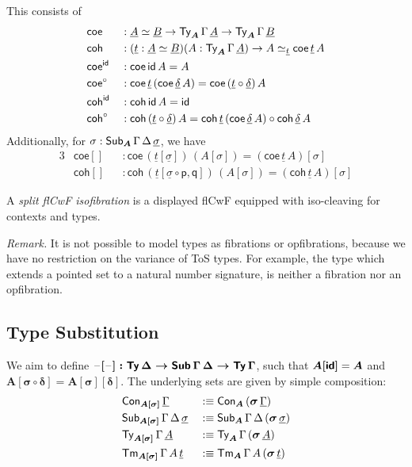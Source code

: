 \documentclass[sigplan,review,anonymous]{acmart}\settopmatter{printfolios=true,printccs=false,printacmref=false}
\newcommand{\p}{\mathsf{p}}
\newcommand{\q}{\mathsf{q}}
\newcommand{\bsigma}{\boldsymbol{\sigma}}
\newcommand{\bA}{\boldsymbol{A}}
\newcommand{\ul}[1]{\underline{#1}}
\newcommand{\ulGamma}{\ul{\Gamma}}
\newcommand{\uldelta}{\ul{\delta}}
\newcommand{\ulsigma}{\ul{\sigma}}
\newcommand{\ult}{\ul{t}}
\newcommand{\ulA}{\ul{A}}
\newcommand{\ulB}{\ul{B}}
\newcommand{\coe}{\mathsf{coe}}
\newcommand{\coh}{\mathsf{coh}}
\begin{document}
\begin{definition} This consists of
\begin{alignat*}{3}
  & \coe &&: \ulA \simeq \ulB \ra \Ty_{\bA}\,\Gamma\,\ulA \ra \Ty_{\bA}\,\Gamma\,\ulB\\
  & \coh &&: (\ult : \ulA \simeq \ulB)(A : \Ty_{\bA}\,\Gamma\,\ulA)
           \ra A \simeq_{\ult} \coe\,\ult\,A\\
  & \coe^{\id} && : \coe\,\id\,A = A\\
  & \coe^{\circ} && : \coe\,\ult\,(\coe\,\uldelta\,A) = \coe\,(\ult\circ\uldelta)\,A\\
  & \coh^{\id} &&: \coh\,\id\,A = \id\\
  & \coh^{\circ} &&: \coh\,(\ult\circ\uldelta)\,A = \coh\,\ult\,(\coe\,\uldelta\,A)
          \circ \coh\,\uldelta\,A
\end{alignat*}
Additionally, for $\sigma : \Sub_{\bA}\,\Gamma\,\Delta\,\ulsigma$, we have
\begin{alignat*}{3}
  & \coe[] &&: \coe\,(\ult[\ulsigma])\,(A[\sigma]) = (\coe\,\ult\,A)[\sigma]\\
  & \coh[] &&: \coh\,(\ult[\ulsigma\circ \p,\q])\,(A[\sigma]) = (\coh\,\ult\,A)[\sigma]
\end{alignat*}

\end{definition}

\begin{definition} A \emph{split flCwF isofibration} is a displayed flCwF equipped with iso-cleaving for contexts and types.
\end{definition}

\emph{Remark.} It is not possible to model types as fibrations or opfibrations,
because we have no restriction on the variance of ToS types. For example, the
type which extends a pointed set to a natural number signature, is neither a
fibration nor an opfibration.

\subsection{Type Substitution}
We aim to define $\boldsymbol{\mathord{\hspace{1pt}\text{--}\hspace{1pt}}[\mathord{\hspace{1pt}\text{--}\hspace{1pt}}] : \mathsf{Ty}\,\Delta \rightarrow
  \mathsf{Sub}\,\Gamma\,\Delta \rightarrow \mathsf{Ty}\,\Gamma}$, such that $\boldsymbol{A[\id]} = \bA$
and $\boldsymbol{A[\sigma\circ\delta]} = \boldsymbol{A[\sigma][\delta]}$. The
underlying sets are given by simple composition:
\begin{alignat*}{3}
  & \Con_{\boldsymbol{A[\sigma]}}\,\ulGamma && :\equiv \Con_{\bA}\,(\bsigma\,\ulGamma)\\
  & \Sub_{\boldsymbol{A[\sigma]}}\,\Gamma\,\Delta\,\ulsigma && :\equiv
    \Sub_{\bA}\,\Gamma\,\Delta\,(\bsigma\,\ulsigma)\\
  & \Ty_{\boldsymbol{A[\sigma]}}\,\Gamma\,\ulA && :\equiv
      \Ty_{\bA}\,\Gamma\,(\bsigma\,\ulA)\\
  & \Tm_{\boldsymbol{A[\sigma]}}\,\Gamma\,A\,\ult && :\equiv
      \Tm_{\bA}\,\Gamma\,A\,(\bsigma\,\ult)
\end{alignat*}
\end{document}
